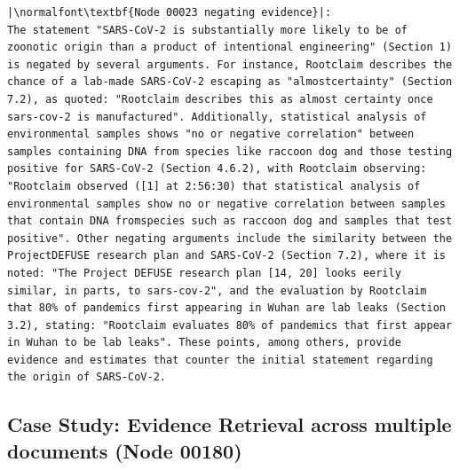 \documentclass{article}
\begin{document}
\begin{lstlisting}
|\normalfont\textbf{Node 00023 negating evidence}|:
The statement "SARS-CoV-2 is substantially more likely to be of zoonotic origin than a product of intentional engineering" (Section 1) is negated by several arguments. For instance, Rootclaim describes the chance of a lab-made SARS-CoV-2 escaping as "almostcertainty" (Section 7.2), as quoted: "Rootclaim describes this as almost certainty once sars-cov-2 is manufactured". Additionally, statistical analysis of environmental samples shows "no or negative correlation" between samples containing DNA from species like raccoon dog and those testing positive for SARS-CoV-2 (Section 4.6.2), with Rootclaim observing: "Rootclaim observed ([1] at 2:56:30) that statistical analysis of environmental samples show no or negative correlation between samples that contain DNA fromspecies such as raccoon dog and samples that test positive". Other negating arguments include the similarity between the ProjectDEFUSE research plan and SARS-CoV-2 (Section 7.2), where it is noted: "The Project DEFUSE research plan [14, 20] looks eerily similar, in parts, to sars-cov-2", and the evaluation by Rootclaim that 80% of pandemics first appearing in Wuhan are lab leaks (Section 3.2), stating: "Rootclaim evaluates 80% of pandemics that first appear in Wuhan to be lab leaks". These points, among others, provide evidence and estimates that counter the initial statement regarding the origin of SARS-CoV-2.

\end{lstlisting}




\subsection{Case Study: Evidence Retrieval across multiple documents (Node 00180)}
\end{document}
